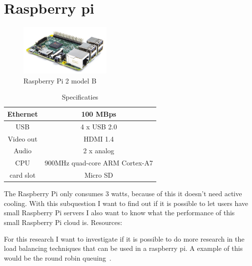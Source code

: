 \documentclass{sig-alternate-br}
\begin{document}
\section{Raspberry pi}
\begin{figure}[H]
\centering 
\includegraphics[width=0.4\textwidth]{Pi2ModB1GB_-comp.jpeg}
\caption{Raspberry Pi 2 model B}
\label{fig:raspberry} %
\end{figure}
\begin{table}[H]
	\centering \caption{Specificaties}
	\begin{tabular}{|c|c|} \hline
		Ethernet & 100 MBps \\ \hline
		USB & 4 x USB 2.0 \\ \hline
		Video out & HDMI 1.4 \\ \hline
		Audio & 2 x analog \\ \hline
		CPU & 900MHz quad-core ARM Cortex-A7 \\ \hline
		card slot & Micro SD  \\ \hline
	\end{tabular}
		\label{tab:Specificaties}
\end{table}
The Raspberry Pi only consumes 3 watts, because of this it doesn't need active cooling. 
With this subquestion I want to find out if it is possible to let users have small Raspberry Pi servers I also want to know what the performance of this small Raspberry Pi cloud is. 
Resources:
\cite{Pcextreme,nginx-load-balancing,nginx-load-balancing-2}

For this research I want to investigate if it is possible to do more research in the 
load balancing techniques that can be used in a raspberry pi. A example of this would be the round robin queuing~\cite{nginx-load-balancing,nginx-load-balancing-2}.
\end{document}
